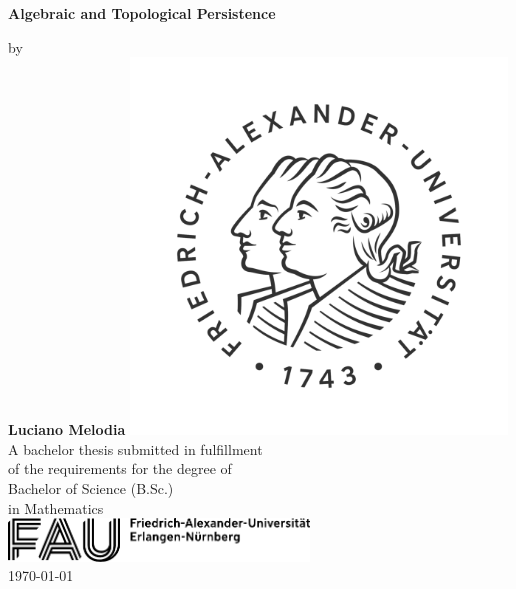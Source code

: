 \begin{titlepage}
    \begin{center}
        \vspace*{1cm}
        \Huge
        \textbf{Algebraic and Topological Persistence}
        \vspace{1cm}
        \Large
                
        by\\
        \textbf{Luciano Melodia}
        \vfill
        \includegraphics[width=10cm]{images/fau.png}
        \vfill
        A bachelor thesis submitted in fulfillment\\
        of the requirements for the degree of\\
        Bachelor of Science (B.Sc.)\\
        in Mathematics\\ 
        \vspace{1.5cm}
        \large
        \includegraphics[width=8cm]{images/fau.pdf}\\
        \today
    \end{center}
\end{titlepage}